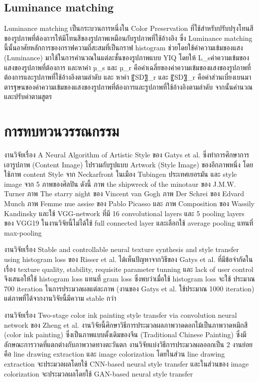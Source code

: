 \documentclass[12pt,oneside,openright,a4paper]{cpe-thai-project}
\begin{document}
\subsection{Luminance matching}
Luminance matching เป็นกระบวนการหนึ่งใน Color Preservation ที่ใช้สำหรับปรับปรุงโทนสีของรูปภาพที่ต้องการให้มีโทนสีของรูปภาพเหมือนกับรูปภาพที่ใช้อ้างอิง ซึ่ง Luminance matching นี้นั้นอาศัยหลักการของกราฟความถี่สะสมที่เป็นกราฟ histogram ช่วยโดยใช้ค่าความเข้มของแสง (Luminance) มาใช้ในการคำนวณในแต่ละชั้นของรูปภาพแบบ YIQ โดยให้ L_sค่าความเข้มของแสงของรูปภาพที่ต้องการ และหาค่า µ_s และ µ_r คือค่าเฉลี่ยของค่าความเข้มของแสงของรูปภาพที่ต้องการและรูปภาพที่ใช้อ้างอิงตามลำดับ และ หาค่า 〖SD〗_r และ 〖SD〗_r คือค่าส่วนเบี่ยงเบนมาตารฐษนของค่าความเข้มของแสงของรูปภาพที่ต้องการและรูปภาพที่ใช้อ้างอิงตามลำดับ จากนั้นคำนวณและปรับค่าตามสูตร

\section{การทบทวนวรรณกรรม}
\par\setlength{\parindent}{5ex}
งานวิจัยเรื่อง A Neural Algorithm of Artistic Style ของ Gatys  et al.\cite{gatys2015neural} ซึ่งทำการศึกษาการเอารูปภาพ (Content Image) ไปรวมกับรูปแบบ Artwork (Style Image) ของอีกภาพหนึ่ง โดยใช้ภาพ content Style จาก Neckarfront ในเมือง Tubingen ประเทศเยอรมัน และ style image จาก 5 ภาพของศิลปิน ดังนี้ ภาพ the shipwreck of the minotaur ของ J.M.W. Turner ภาพ The starry night ของ Vincent van Gogh ภาพ Der Schrei ของ Edvard Munch ภาพ Femme nue assise ของ Pablo Picasso และ ภาพ Composition ของ Wassily Kandinsky  และใช้  VGG-network  ที่มี 16 convolutional layers และ 5 pooling layers ของ VGG19 ในงานวิจัยนี้ไม่ได้ใช้ full connected layer และเลือกใช้ average pooling แทนที่ max-pooling 
\par\setlength{\parindent}{5ex}
งานวิจัยเรื่อง Stable and controllable neural texture synthesis and style transfer using histogram loss ของ Risser et al. ได้เห็นปัญหาจากวิธีของ Gatys et al. ที่มีข้อจำกัดในเรื่อง texture quality, stability, requisite parameter tunning และ lack of user control จึงเสนอให้ใช้ histogram loss แทนที่ gram loss ซึ่งพบว่าเมื่อใช้ histogram loss จะใช้ ประมาณ 700 iteration ในการประมวลผลแต่ละภาพ  (งานของ Gatys et al. ใช้ประมาณ 1000 iteration) แต่ภาพที่ได้จากงานวิจัยนี้มีความ stable กว่า 
\par\setlength{\parindent}{5ex}
งานวิจัยเรื่อง Two-stage color ink painting style transfer via convolution neural network ของ Zheng et al.\cite{8636278} งานวิจัยนี้ศึกษาวิธีการประมวลผลภาพวาดดอกไม้เป็นภาพวาดหมึกสี (color ink painting) ซึ่งเป็นภาพแบบดั้งเดิมของจีน (Traditional Chinese Painting) ซึ่งมีลักษณะการวาดที่แตกต่างกับภาพวาดทางตะวันตก งานวิจัยแบ่งวิธีการประมวลผลออกเป็น 2 งานย่อย คือ line drawing extraction และ image colorization โดยในส่วน line drawing extraction จะประมวลผลโดยใช้ CNN-based neural style transfer และในส่วนของ image colorization จะประมวลผลโดยใช้ GAN-based neural style transfer
\end{document}
